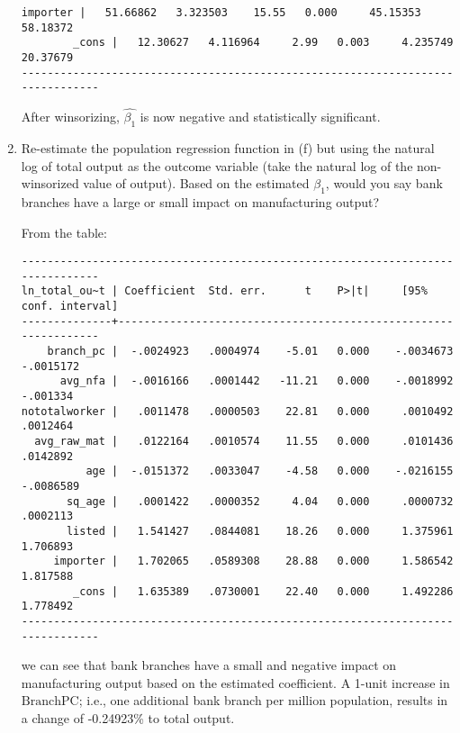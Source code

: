 \documentclass[11pt,twoside,openany]{memoir}
\begin{document}
\begin{question}
\begin{enumerate}[label = (\alph*),itemsep=1pt,topsep=3pt]
{\begin{solution}
\begin{Verbatim}[fontsize=\footnotesize]
     importer |   51.66862   3.323503    15.55   0.000     45.15353    58.18372
        _cons |   12.30627   4.116964     2.99   0.003     4.235749    20.37679
-------------------------------------------------------------------------------
                \end{Verbatim}
            After winsorizing, $\widehat{\beta_1}$ is now negative and statistically significant.
            \end{solution}}
        \item Re-estimate the population regression function in (f) but using the natural log of total output as the outcome variable (take the natural log of the non-winsorized value of output). Based on the estimated $\beta_1$, would you say bank branches have a large or small impact on manufacturing output?
            {\color{blue} \begin{solution}
                From the table:
                \begin{Verbatim}
-------------------------------------------------------------------------------
ln_total_ou~t | Coefficient  Std. err.      t    P>|t|     [95% conf. interval]
--------------+----------------------------------------------------------------
    branch_pc |  -.0024923   .0004974    -5.01   0.000    -.0034673   -.0015172
      avg_nfa |  -.0016166   .0001442   -11.21   0.000    -.0018992    -.001334
nototalworker |   .0011478   .0000503    22.81   0.000     .0010492    .0012464
  avg_raw_mat |   .0122164   .0010574    11.55   0.000     .0101436    .0142892
          age |  -.0151372   .0033047    -4.58   0.000    -.0216155   -.0086589
       sq_age |   .0001422   .0000352     4.04   0.000     .0000732    .0002113
       listed |   1.541427   .0844081    18.26   0.000     1.375961    1.706893
     importer |   1.702065   .0589308    28.88   0.000     1.586542    1.817588
        _cons |   1.635389   .0730001    22.40   0.000     1.492286    1.778492
-------------------------------------------------------------------------------
                \end{Verbatim}
                we can see that bank branches have a small and negative impact on manufacturing output based on the estimated coefficient. A 1-unit increase in $\text{BranchPC}$; i.e., one additional bank branch per million population, results in a change of -0.24923\% to total output. 
            \end{solution}}

\end{enumerate}
\end{question}
\end{document}
